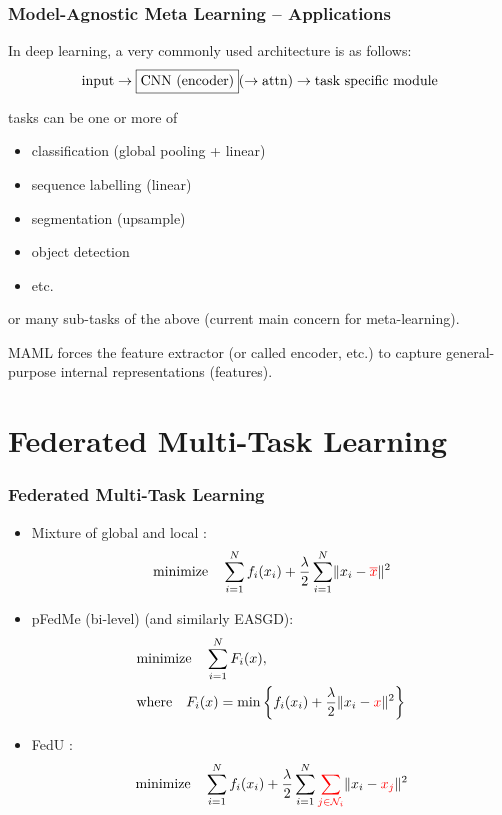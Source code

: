 
\begin{frame}
\frametitle{Model-Agnostic Meta Learning -- Applications}

In deep learning, a very commonly used architecture is as follows:
$$\text{input} \to \framebox{CNN (encoder)} ( \to \text{attn}) \to \text{task specific module}$$

tasks can be one or more of
\begin{itemize}
    \item classification (global pooling + linear)
    \item sequence labelling (linear)
    \item segmentation (upsample)
    \item object detection
    \item etc.
\end{itemize}
or many sub-tasks of the above (current main concern for meta-learning).

MAML forces the feature extractor (or called encoder, etc.) to capture general-purpose internal representations (features).

\end{frame}


\section[FMTL]{Federated Multi-Task Learning}


\begin{frame}
\frametitle{Federated Multi-Task Learning}

\begin{itemize}
    \item Mixture of global and local \cite{hanzely2020federated}:
    $$\text{minimize} \quad \sum\limits_{i=1}^N f_i(x_i) + \dfrac{\lambda}{2} \sum\limits_{i=1}^N \lVert x_i - {\color{red} \overline{x}} \rVert^2$$
    \item pFedMe (bi-level) \cite{t2020pfedme} (and similarly EASGD\cite{zhang2015easgd}):
    \begin{align*}
        & \text{minimize} \quad \sum\limits_{i=1}^N F_i(x), \\
        & \text{where} \quad F_i(x) = \min \left\{ f_i(x_i) + \dfrac{\lambda}{2} \lVert x_i - {\color{red} x}\rVert^2 \right\}
    \end{align*}
    \item FedU \cite{dinh2021fedu}:
    $$\text{minimize} \quad \sum\limits_{i=1}^N f_i(x_i) + \dfrac{\lambda}{2} \sum\limits_{i=1}^N {\color{red} \sum\limits_{j\in\mathcal{N}_i}} \lVert x_i - {\color{red} x_j} \rVert^2$$
\end{itemize}

\end{frame}

